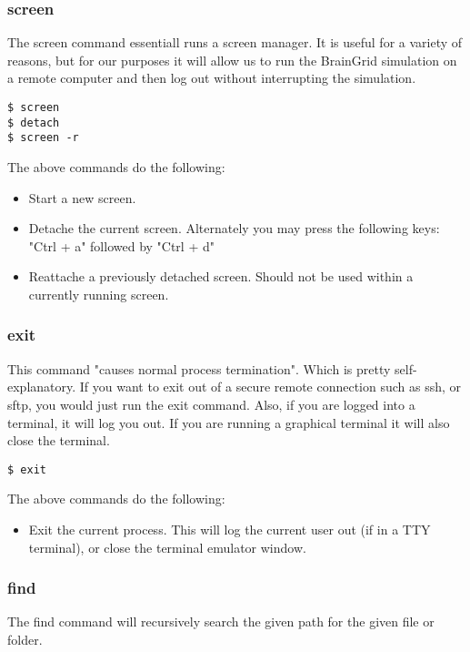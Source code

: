 \subsubsection{screen} \mdseries
The screen command essentiall runs a screen manager.  It is useful for a variety of reasons, but for our purposes it will allow us to run the BrainGrid simulation on a remote computer and then log out without interrupting the simulation.

\begin{lstlisting}
$ screen
$ detach
$ screen -r
\end{lstlisting}

The above commands do the following:
	\begin{itemize}
		\item Start a new screen.
		\item Detache the current screen.  Alternately you may press the following keys: "Ctrl + a" followed by "Ctrl + d"
		\item Reattache a previously detached screen.  Should not be used within a currently running screen.
	\end{itemize}

\subsubsection{exit} \mdseries
This command "causes normal process termination".  Which is pretty self-explanatory.  If you want to exit out of a secure remote connection such as ssh, or sftp, you would just run the exit command.  Also, if you are logged into a terminal, it will log you out.  If you are running a graphical terminal it will also close the terminal.

\begin{lstlisting}
$ exit
\end{lstlisting}

The above commands do the following:
	\begin{itemize}
		\item Exit the current process.  This will log the current user out (if in a TTY terminal), or close the terminal emulator window.
	\end{itemize}


\subsubsection{find} \mdseries
The find command will recursively search the given path for the given file or folder.

